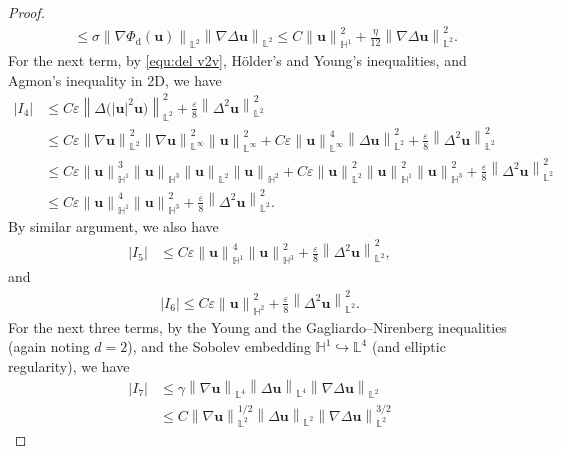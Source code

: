 \documentclass[11pt, reqno]{amsart}
\theoremstyle{definition}
\numberwithin{equation}{section}
\newcommand{\bff}{\boldsymbol}
\newcommand{\bb}{\mathbb}
\newcommand{\norm}[2]{\left\|{#1}\right\|_{#2}}
\newcommand{\abs}[1]{\left|{#1}\right|}
\begin{document}
\begin{proof}
\begin{align*}
    &\leq
    \sigma \norm{\nabla \Phi_{\mathrm{d}}(\bff{u})}{\bb{L}^2} \norm{\nabla\Delta \bff{u}}{\bb{L}^2}
    \leq
    C \norm{\bff{u}}{\bb{H}^1}^2 
    +
    \frac{\eta}{12} \norm{\nabla\Delta \bff{u}}{\bb{L}^2}^2.
\end{align*}
For the next term, by \eqref{equ:del v2v}, H\"older's and Young's inequalities, and Agmon's inequality in 2D, we have
\begin{align*}
    \abs{I_4}
    &\leq
    C\varepsilon \norm{\Delta\big(|\bff{u}|^2 \bff{u}\big)}{\bb{L}^2}^2
    +
    \frac{\varepsilon}{8} \norm{\Delta^2 \bff{u}}{\bb{L}^2}^2
    \\
    &\leq
    C\varepsilon \norm{\nabla \bff{u}}{\bb{L}^2}^2 \norm{\nabla \bff{u}}{\bb{L}^\infty}^2 \norm{\bff{u}}{\bb{L}^\infty}^2
    +
    C\varepsilon \norm{\bff{u}}{\bb{L}^\infty}^4 \norm{\Delta \bff{u}}{\bb{L}^2}^2
    +
    \frac{\varepsilon}{8} \norm{\Delta^2 \bff{u}}{\bb{L}^2}^2
    \\
    &\leq
    C\varepsilon \norm{\bff{u}}{\bb{H}^1}^3 \norm{\bff{u}}{\bb{H}^3} \norm{\bff{u}}{\bb{L}^2} \norm{\bff{u}}{\bb{H}^2}
    +
    C\varepsilon \norm{\bff{u}}{\bb{L}^2}^2 \norm{\bff{u}}{\bb{H}^1}^2 \norm{\bff{u}}{\bb{H}^3}^2
    +
    \frac{\varepsilon}{8} \norm{\Delta^2 \bff{u}}{\bb{L}^2}^2
    \\
    &\leq
    C\varepsilon \norm{\bff{u}}{\bb{H}^1}^4 \norm{\bff{u}}{\bb{H}^3}^2 
    +
    \frac{\varepsilon}{8} \norm{\Delta^2 \bff{u}}{\bb{L}^2}^2.
\end{align*}
By similar argument, we also have
\begin{align*}
    \abs{I_5}
    &\leq
    C\varepsilon \norm{\bff{u}}{\bb{H}^1}^4 \norm{\bff{u}}{\bb{H}^3}^2 
    +
    \frac{\varepsilon}{8} \norm{\Delta^2 \bff{u}}{\bb{L}^2}^2,
\end{align*}
and
\begin{align*}
    \abs{I_6}
    \leq
    C\varepsilon \norm{\bff{u}}{\bb{H}^2}^2 
    +
    \frac{\varepsilon}{8} \norm{\Delta^2 \bff{u}}{\bb{L}^2}^2.
\end{align*}
For the next three terms, by the Young and the Gagliardo--Nirenberg inequalities (again noting $d=2$), and the Sobolev embedding $\bb{H}^1\hookrightarrow \bb{L}^4$ (and elliptic regularity), we have
\begin{align*}
    \abs{I_7}
    &\leq
    \gamma \norm{\nabla \bff{u}}{\bb{L}^4} \norm{\Delta \bff{u}}{\bb{L}^4} \norm{\nabla\Delta \bff{u}}{\bb{L}^2}
    \\
    &\leq
    C \norm{\nabla \bff{u}}{\bb{L}^2}^{1/2} \norm{\Delta \bff{u}}{\bb{L}^2} \norm{\nabla\Delta \bff{u}}{\bb{L}^2}^{3/2}

\end{align*}
\end{proof}
\end{document}
